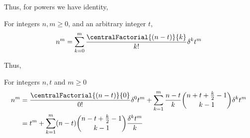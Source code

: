 Thus, for powers we have identity,
\begin{proposition}
  \label{prop:newtons-formula-for-powers}
  For integers $n,m \geq 0$, and an arbitrary integer $t$,
  \begin{align*}
    n^m = \sum_{k=0}^{m} \frac{\centralFactorial{(n-t)}{k}}{k!} \delta^{k} t^m
  \end{align*}
\end{proposition}
Thus,
\begin{proposition}
  \label{prop:powers-in-central-binomial-form}
  For integers $n,t$ and $m \geq 0$
  \begin{align*}
    n^m
    &= \frac{\centralFactorial{(n-t)}{0}}{0!} \delta^{0} t^m
    + \sum_{k=1}^{m} \frac{n-t}{k} \binom{n+t+\frac{k}{2}-1}{k-1} \delta^{k} t^m \\
    &= t^m + \sum_{k=1}^{m} (n-t) \binom{n-t+\frac{k}{2}-1}{k-1} \frac{\delta^{k} t^m}{k}
  \end{align*}
\end{proposition}
